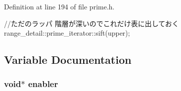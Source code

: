 \-Definition at line 194 of file prime.\-h.


\begin{DoxyCode}
    {
        //ただのラッパ 階層が深いのでこれだけ表に出しておく
        range_detail::prime_iterator::sift(upper);
    }
\end{DoxyCode}


\subsection{\-Variable \-Documentation}
\hypertarget{namespaceyuh_a8b379f3dbc4920262c249049dd41274d}{
\subsubsection[{enabler}]{\setlength{\rightskip}{0pt plus 5cm}void$\ast$ {\bf enabler}}}\label{d5/d2b/namespaceyuh_a8b379f3dbc4920262c249049dd41274d}
